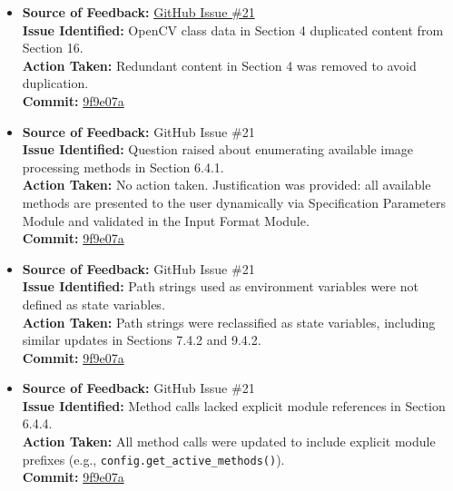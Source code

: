 \documentclass{article}
\begin{document}
\begin{itemize}

  \item \textbf{Source of Feedback:} \href{https://github.com/KiranSingh15/CAS-741-Image-Correspondences/issues/21}{GitHub Issue \#21} \\
  \textbf{Issue Identified:} OpenCV class data in Section 4 duplicated content from Section 16. \\
  \textbf{Action Taken:} Redundant content in Section 4 was removed to avoid duplication. \\
  \textbf{Commit:} \href{https://github.com/KiranSingh15/CAS-741-Image-Correspondences/commit/9f9e07a572e2f0db97f3e057f998ba9bad0d9189}{9f9e07a}

  \item \textbf{Source of Feedback:} GitHub Issue \#21 \\
  \textbf{Issue Identified:} Question raised about enumerating available image processing methods in Section 6.4.1. \\
  \textbf{Action Taken:} No action taken. Justification was provided: all available methods are presented to the user dynamically via Specification Parameters Module and validated in the Input Format Module. \\
  \textbf{Commit:} \href{https://github.com/KiranSingh15/CAS-741-Image-Correspondences/commit/9f9e07a572e2f0db97f3e057f998ba9bad0d9189}{9f9e07a}

  \item \textbf{Source of Feedback:} GitHub Issue \#21 \\
  \textbf{Issue Identified:} Path strings used as environment variables were not defined as state variables. \\
  \textbf{Action Taken:} Path strings were reclassified as state variables, including similar updates in Sections 7.4.2 and 9.4.2. \\
  \textbf{Commit:} \href{https://github.com/KiranSingh15/CAS-741-Image-Correspondences/commit/9f9e07a572e2f0db97f3e057f998ba9bad0d9189}{9f9e07a}

  \item \textbf{Source of Feedback:} GitHub Issue \#21 \\
  \textbf{Issue Identified:} Method calls lacked explicit module references in Section 6.4.4. \\
  \textbf{Action Taken:} All method calls were updated to include explicit module prefixes (e.g., \texttt{config.get\_active\_methods()}). \\
  \textbf{Commit:} \href{https://github.com/KiranSingh15/CAS-741-Image-Correspondences/commit/9f9e07a572e2f0db97f3e057f998ba9bad0d9189}{9f9e07a}


\end{itemize}
\end{document}
